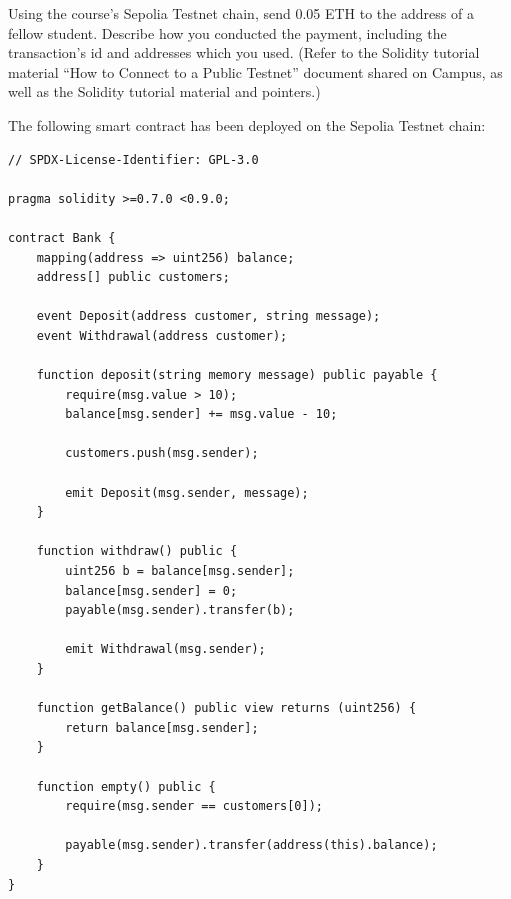 \documentclass[12pt,addpoints,answers]{exam}
\begin{document}
\begin{questions}

\newpage

\question[10] Using the course’s Sepolia  Testnet chain, send 0.05 ETH to the address of a fellow student. Describe how you conducted the payment, including the transaction’s id and addresses which you used. (Refer to the Solidity tutorial material “How to Connect
to a Public Testnet” document shared on Campus, as well as the Solidity
tutorial material and pointers.) 

    

\newpage
  
\question The following smart contract has been deployed on the Sepolia Testnet chain:

{\footnotesize

\begin{verbatim}
// SPDX-License-Identifier: GPL-3.0

pragma solidity >=0.7.0 <0.9.0;

contract Bank {
    mapping(address => uint256) balance;
    address[] public customers;

    event Deposit(address customer, string message);
    event Withdrawal(address customer);

    function deposit(string memory message) public payable {
        require(msg.value > 10);
        balance[msg.sender] += msg.value - 10;

        customers.push(msg.sender);

        emit Deposit(msg.sender, message);
    }

    function withdraw() public {
        uint256 b = balance[msg.sender];
        balance[msg.sender] = 0;
        payable(msg.sender).transfer(b);

        emit Withdrawal(msg.sender);
    }

    function getBalance() public view returns (uint256) {
        return balance[msg.sender];
    }
    
    function empty() public {
        require(msg.sender == customers[0]);
        
        payable(msg.sender).transfer(address(this).balance);
    }
}
\end{verbatim}

} %


\end{questions}
\end{document}
